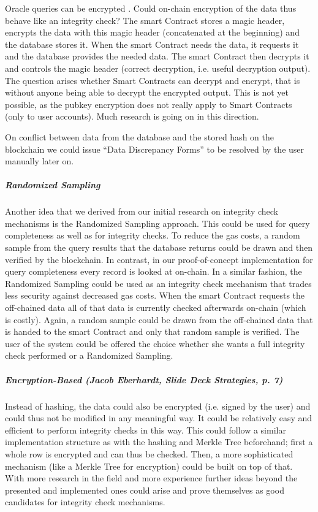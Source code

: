 Oracle queries can be encrypted \cite{futureWork01}. Could on-chain encryption of the data thus behave like an integrity check? The smart Contract stores a magic header, encrypts the data with this magic header (concatenated at the beginning) and the database stores it.
When the smart Contract needs the data, it requests it and the database provides the needed data. The smart Contract then decrypts it and controls the magic header (correct decryption, i.e. useful decryption output).
The question arises whether Smart Contracts can decrypt and encrypt, that is without anyone being able to decrypt the encrypted output. This is not yet possible, as the pubkey encryption does not really apply to Smart Contracts (only to user accounts). Much research is going on in this direction.

On conflict between data from the database and the stored hash on the blockchain we could issue “Data Discrepancy Forms” to be resolved by the user manually later on.

\subparagraph{Randomized Sampling}
Another idea that we derived from our initial research on integrity check mechanisms is the Randomized Sampling approach. This could be used for query completeness as well as for integrity checks.
To reduce the gas costs, a random sample from the query results that the database returns could be drawn and then verified by the blockchain. In contrast, in our proof-of-concept implementation for query completeness every record is looked at on-chain.
In a similar fashion, the Randomized Sampling could be used as an integrity check mechanism that trades less security against decreased gas costs. When the smart Contract requests the off-chained data all of that data is currently checked afterwards on-chain (which is costly). Again, a random sample could be drawn from the off-chained data that is handed to the smart Contract and only that random sample is verified. The user of the system could be offered the choice whether she wants a full integrity check performed or a Randomized Sampling.

\subparagraph{Encryption-Based (Jacob Eberhardt, Slide Deck Strategies, p. 7)}
Instead of hashing, the data could also be encrypted (i.e. signed by the user) and could thus not be modified in any meaningful way. It could be relatively easy and efficient to perform integrity checks in this way.
This could follow a similar implementation structure as with the hashing and Merkle Tree beforehand; first a whole row is encrypted and can thus be checked. Then, a more sophisticated mechanism (like a Merkle Tree for encryption) could be built on top of that. With more research in the field and more experience further ideas beyond the presented and implemented ones could arise and prove themselves as good candidates for integrity check mechanisms.

